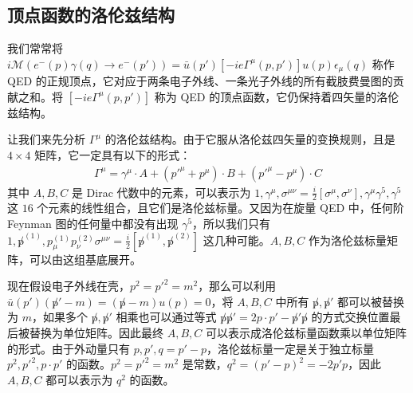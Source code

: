 \subsection{顶点函数的洛伦兹结构}
我们常常将 $i\mathcal{M}(e^-(p)\gamma(q)\rightarrow e^-(p'))=\bar u(p') [-ie\Gamma^\mu(p,p')]u(p) \epsilon_\mu(q)$ 称作 QED 的正规顶点，它对应于两条电子外线、一条光子外线的所有截肢费曼图的贡献之和。将 $[-ie\Gamma^\mu(p,p')]$ 称为 QED 的顶点函数，它仍保持着四矢量的洛伦兹结构。

让我们来先分析 $\Gamma^\mu$ 的洛伦兹结构。由于它服从洛伦兹四矢量的变换规则，且是 $4\times 4$ 矩阵，它一定具有以下的形式：
\begin{equation}
\begin{aligned}
\Gamma^\mu=\gamma^\mu\cdot A + ({p'}^\mu + p^\mu)\cdot B + ({p'}^\mu - p^\mu) \cdot C
\end{aligned}
\end{equation}
其中 $A,B,C$ 是 Dirac 代数中的元素，可以表示为 $1,\gamma^\mu,\sigma^{\mu\nu}=\frac{i}{2}[\sigma^\mu,\sigma^\nu],\gamma^\mu\gamma^5,\gamma^5$ 这 $16$ 个元素的线性组合，且它们是洛伦兹标量。又因为在旋量 QED 中，任何阶 Feynman 图的任何量中都没有出现 $\gamma^5$，所以我们只有 $1,\not p^{(1)},p_\mu^{(1)} p_\nu^{(2)} \sigma^{\mu\nu}=\frac{i}{2}[\not p^{(1)},\not p^{(2)}]$ 这几种可能。$A,B,C$ 作为洛伦兹标量矩阵，可以由这组基底展开。

现在假设电子外线在壳，$p^2=p'^2=m^2$，那么可以利用 $\bar u(p')(\not p'-m)= (\not p-m)u(p)=0$，将 $A,B,C$ 中所有 $\not p,\not p'$ 都可以被替换为 $m$，如果多个 $\not p,\not p'$ 相乘也可以通过等式 $\not p\not p'=2p\cdot p'-\not p'\not p$ 的方式交换位置最后被替换为单位矩阵。因此最终 $A,B,C$ 可以表示成洛伦兹标量函数乘以单位矩阵的形式。由于外动量只有 $p,p',q=p'-p$，洛伦兹标量一定是关于独立标量 $p^2,{p'}^2,p\cdot p'$ 的函数。$p^2={p'}^2=m^2$ 是常数，$q^2=(p'-p)^2 = -2p'p$，因此 $A,B,C$ 都可以表示为 $q^2$ 的函数。

